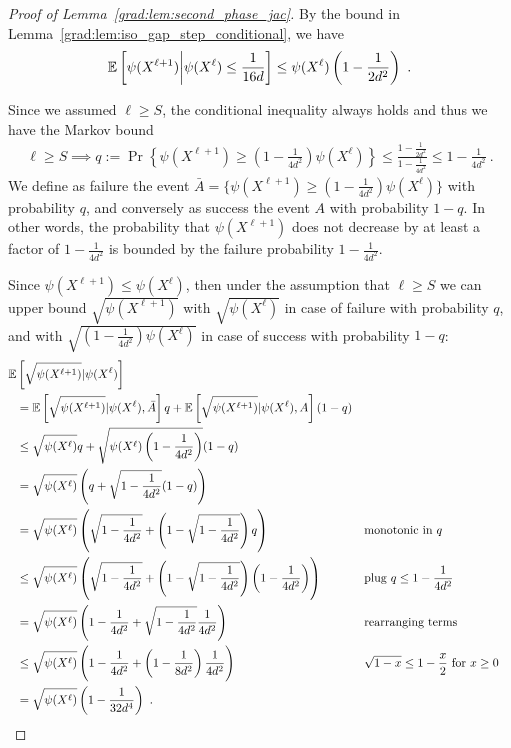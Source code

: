 \begin{proof}[Proof of Lemma~\ref{grad:lem:second_phase_jac}]
    By the bound in Lemma~\ref{grad:lem:iso_gap_step_conditional}, we have
    \begin{align}
    \mathbb{E}\left[\psi(X^{\ell + 1}) \middle| \psi(X^\ell)\le \frac{1}{16d}\right]
    \le \psi(X^\ell)\left(1-\frac{1}{2d^2}\right)~.
    \end{align}
    
    Since we assumed $\ell\ge S$, the conditional inequality always holds and thus we have the Markov bound
    \begin{align}
    \label{grad:eqn:after_thresh}
    \ell\ge S\implies q:=\Pr\left\{\psi(X^{\ell + 1}) \ge \left(1-\frac{1}{4d^2}\right)\psi(X^\ell)\right\}
    \le \frac{1-\frac{1}{2d^2}}{1-\frac{1}{4d^2}}\le 1 - \frac{1}{4d^2}~.
    \end{align}
    We define as failure the event $\bar{A} = \{\psi(X^{\ell + 1}) \ge (1-\frac{1}{4d^2})\psi(X^\ell)\}$ with probability $q$, and conversely as success the event $A$ with probability $1-q$. 
    In other words, the probability that $\psi(X^{\ell + 1})$ does not decrease by at least a factor of $1-\frac{1}{4d^2}$ is bounded by the failure probability $1 - \frac{1}{4d^2}.$ 
    
    Since $\psi(X^{\ell + 1}) \leq \psi(X^\ell)$, then under the assumption that $\ell \ge S$ we can upper bound $\sqrt{\psi(X^{\ell + 1})}$ with $\sqrt{\psi(X^\ell)}$ in case of failure with probability $q$, and with $\sqrt{(1-\frac{1}{4d^2})\psi(X^\ell)}$ in case of success with probability $1-q$: 
    \begin{align}
    \mathbb{E} &\left[\sqrt{\psi(X^{\ell + 1})}|\psi(X^\ell)\right] \\
    &= \mathbb{E} \left[\sqrt{\psi(X^{\ell + 1})}|\psi(X^\ell), \bar{A}\right] q + \mathbb{E} \left[\sqrt{\psi(X^{\ell + 1})}|\psi(X^\ell), A\right] (1-q) \\
    &\le \sqrt{\psi(X^\ell)} q + \sqrt{\psi(X^\ell)\left(1-\frac{1}{4d^2}\right)} (1-q)\\
    &= \sqrt{\psi(X^\ell)} \left(q + \sqrt{1-\frac{1}{4d^2}} (1-q)\right)\\
    &= \sqrt{\psi(X^\ell)} \left(\sqrt{1-\frac{1}{4d^2}} +\left(1-\sqrt{1-\frac{1}{4d^2}}\right)q\right) && \text{monotonic in $q$}\\
    &\le \sqrt{\psi(X^\ell)}\left(\sqrt{1-\frac{1}{4d^2}} + \left(1-\sqrt{1-\frac{1}{4d^2}}\right)\left(1-\frac{1}{4d^2}\right) \right) && \text{plug $q\le 1-\frac{1}{4d^2}$}\\ 
    &= \sqrt{\psi(X^\ell)} \left(1 - \frac{1}{4d^2} + \sqrt{1-\frac{1}{4d^2}}\frac{1}{4d^2}\right) && \text{rearranging terms} \\
    &\le \sqrt{\psi(X^\ell)} \left(1 - \frac{1}{4d^2} + \left(1-\frac{1}{8d^2}\right)\frac{1}{4d^2}\right) && \text{$\sqrt{1-x}\le 1-\frac{x}{2}$ for $x\ge 0$} \\
    &= \sqrt{\psi(X^\ell)} \left(1 - \frac{1}{32d^4}\right)~.
    \end{align}


\end{proof}
